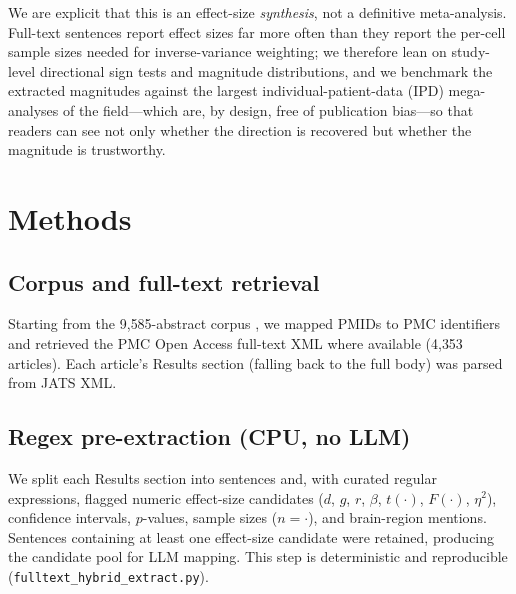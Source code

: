 \documentclass[11pt]{article}
\begin{document}
We are explicit that this is an effect-size \emph{synthesis}, not a definitive
meta-analysis. Full-text sentences report effect sizes far more often than they
report the per-cell sample sizes needed for inverse-variance weighting; we
therefore lean on study-level directional sign tests and magnitude
distributions, and we benchmark the extracted magnitudes against the largest
individual-patient-data (IPD) mega-analyses of the field---which are, by design,
free of publication bias---so that readers can see not only whether the
direction is recovered but whether the magnitude is trustworthy.

\section{Methods}

\subsection{Corpus and full-text retrieval}
Starting from the 9{,}585-abstract corpus \cite{kang2026scoping}, we mapped
PMIDs to PMC identifiers and retrieved the PMC Open Access full-text XML where
available (4{,}353 articles). Each article's Results section (falling back to the
full body) was parsed from JATS XML.

\subsection{Regex pre-extraction (CPU, no LLM)}
We split each Results section into sentences and, with curated regular
expressions, flagged numeric effect-size candidates ($d$, $g$, $r$, $\beta$,
$t(\cdot)$, $F(\cdot)$, $\eta^2$), confidence intervals, $p$-values, sample sizes
($n=\cdot$), and brain-region mentions. Sentences containing at least one
effect-size candidate were retained, producing the candidate pool for LLM
mapping. This step is deterministic and reproducible
(\texttt{fulltext\_hybrid\_extract.py}).
\end{document}
